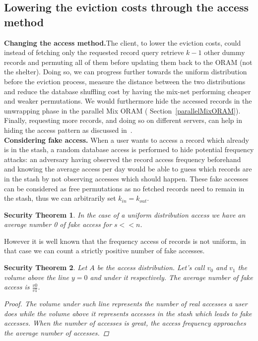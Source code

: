 \documentclass{llncs}
\newtheorem{secthm}{Security Theorem}
\begin{document}
\subsection{Lowering the eviction costs through the access method}\label{AccessMethod}

\noindent\textbf{Changing the access method.}The client, to lower the eviction costs, could instead of fetching only the requested record query retrieve $k-1$ other dummy records and permuting all of them before updating them back to the ORAM (not the shelter).
Doing so, we can progress further towards the uniform distribution before the eviction process, measure the distance between the two distributions and reduce the database shuffling cost by having the mix-net performing cheaper and weaker permutations. We would furthermore hide the accessed records in the unwrapping phase in the parallel Mix ORAM ( Section~\ref{parallelMixORAM}). Finally, requesting more records, and doing so on different servers, can help in hiding the access pattern as discussed in~\cite{toledo2016lower}.\\

\noindent\textbf{Considering fake access.} When a user wants to access a record which already is in the stash, a random database access is performed to hide potential frequency attacks: an adversary having observed the record access frequency beforehand and knowing the average access per day would be able to guess which records are in the stash by not observing accesses which should happen.
These fake accesses can be considered as free permutations as no fetched records need to remain in the stash, thus we can arbitrarily set $k_{in}=k_{out}$.
%
\begin{secthm}
In the case of a uniform distribution access we have an average number 0 of fake access for $s<<n$.
\end{secthm}
%
However it is well known that the frequency access of records is not uniform, in that case we can count a strictly positive number of fake accesses.
\begin{secthm}
Let $A$ be the access distribution. Let's call $v_0$ and $v_1$ the volume above the line $y=0$ and under it respectively.
The average number of fake access is $ \frac{v0}{v1}$.
\begin{proof}
 The volume under such line represents the number of real accesses a user does while the volume above it represents accesses in the stash which leads to fake accesses.
 When the number of accesses is great, the access frequency approaches the average number of accesses.
\end{proof}
\end{secthm}
\end{document}
